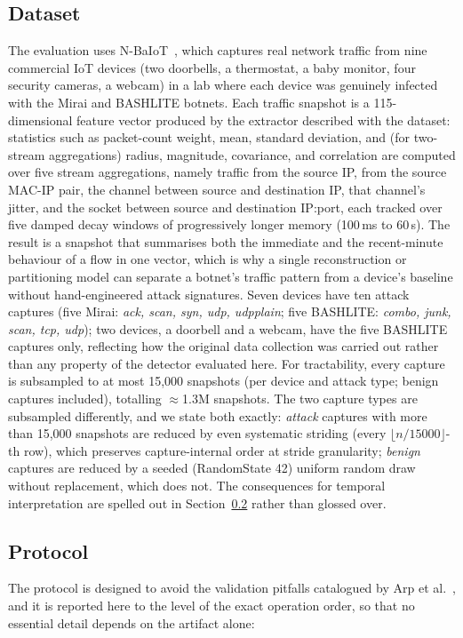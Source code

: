 \documentclass[sigconf,review,anonymous]{acmart}
\begin{document}
\subsection{Dataset}
The evaluation uses N-BaIoT~\cite{meidan2018nbaiot}, which captures real network traffic from nine commercial IoT devices (two doorbells, a thermostat, a baby monitor, four security cameras, a webcam) in a lab where each device was genuinely infected with the Mirai and BASHLITE botnets. Each traffic snapshot is a 115-dimensional feature vector produced by the extractor described with the dataset: statistics such as packet-count weight, mean, standard deviation, and (for two-stream aggregations) radius, magnitude, covariance, and correlation are computed over five stream aggregations, namely traffic from the source IP, from the source MAC-IP pair, the channel between source and destination IP, that channel's jitter, and the socket between source and destination IP:port, each tracked over five damped decay windows of progressively longer memory (100\,ms to 60\,s). The result is a snapshot that summarises both the immediate and the recent-minute behaviour of a flow in one vector, which is why a single reconstruction or partitioning model can separate a botnet's traffic pattern from a device's baseline without hand-engineered attack signatures. Seven devices have ten attack captures (five Mirai: \emph{ack, scan, syn, udp, udpplain}; five BASHLITE: \emph{combo, junk, scan, tcp, udp}); two devices, a doorbell and a webcam, have the five BASHLITE captures only, reflecting how the original data collection was carried out rather than any property of the detector evaluated here. For tractability, every capture is subsampled to at most 15{,}000 snapshots (per device and attack type; benign captures included), totalling $\approx$1.3M snapshots. The two capture types are subsampled differently, and we state both exactly: \emph{attack} captures with more than 15{,}000 snapshots are reduced by even systematic striding (every $\lfloor n/15000 \rfloor$-th row), which preserves capture-internal order at stride granularity; \emph{benign} captures are reduced by a seeded (RandomState 42) uniform random draw without replacement, which does not. The consequences for temporal interpretation are spelled out in Section~\ref{sec:protocol} rather than glossed over.

\subsection{Protocol}
\label{sec:protocol}
The protocol is designed to avoid the validation pitfalls catalogued by Arp et al.~\cite{arp2022dodo}, and it is reported here to the level of the exact operation order, so that no essential detail depends on the artifact alone:
\end{document}
